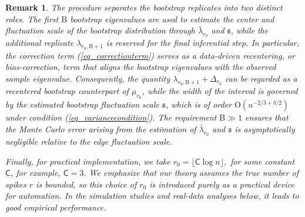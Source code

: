 \documentclass[12pt]{article}
\theoremstyle{plain}
\newtheorem{remark}{Remark}[section]
\numberwithin{equation}{section}
\begin{document}
\begin{remark}\label{rmk_rmkaftermaininferenceprocedure}
	The procedure separates the bootstrap replicates into two distinct roles. The first $\mathrm{B}$ bootstrap eigenvalues are used to estimate the center and fluctuation scale of the bootstrap distribution through $\bar\lambda_{r_0}$ and $\mathfrak{s}$, while the additional replicate $\lambda_{r_0,\mathrm{B}+1}$ is reserved for the final inferential step. In particular, the correction term (\ref{eq_correctionterm}) serves as a data-driven recentering, or bias-correction, term that aligns the bootstrap eigenvalues with the observed sample eigenvalue. Consequently, the quantity $\lambda_{r_0,\mathrm{B}+1}+\Delta_{r_0}$ can be regarded as a recentered bootstrap counterpart of $\mu_{r_0}$, while the width of the interval is governed by the estimated bootstrap fluctuation scale $\mathfrak{s}$, which is of order $\mathrm{O}(n^{-2/3+\delta/2})$ under condition (\ref{eq_variancecondition}). The requirement $\mathrm{B}\gg 1$ ensures that the Monte Carlo error arising from the estimation of $\bar\lambda_{r_0}$ and $\mathfrak{s}$ is asymptotically negligible relative to the edge fluctuation scale. 
	
	Finally, for practical implementation, we take $r_0=\lfloor \mathsf{C}\log n\rfloor,$ for some constant $\mathsf{C}$, for example, $\mathsf{C}=3$. We emphasize that our theory assumes the true number of spikes $r$ is bounded, so this choice of $r_0$ is introduced purely as a practical device for automation. In the simulation studies and real-data analyses below, it leads to good empirical performance.
\end{remark}
\end{document}
